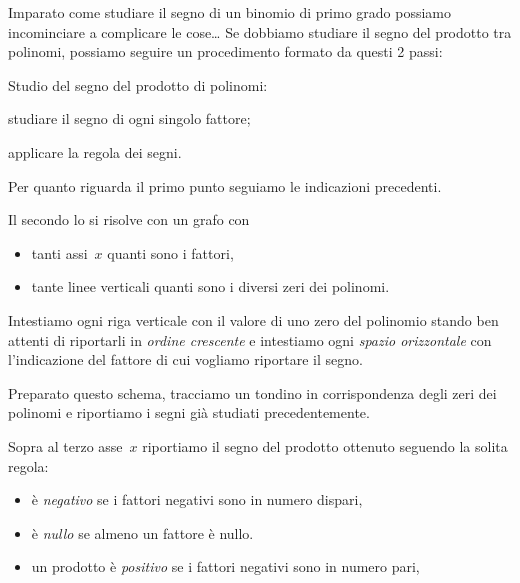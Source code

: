Imparato come studiare il segno di un binomio di primo grado possiamo 
incominciare a complicare le cose\dots
Se dobbiamo studiare il segno del prodotto tra polinomi, possiamo 
seguire un procedimento formato da questi 2 passi:

\begin{procedura}{}{}
 Studio del segno del prodotto di polinomi:
\begin{enumeratea}
\item studiare il segno di ogni singolo fattore;
\item applicare la regola dei segni.
\end{enumeratea}
\end{procedura}

Per quanto riguarda il primo punto seguiamo le indicazioni precedenti. 

Il secondo lo si risolve con un grafo con
\begin{itemize} [noitemsep]
\item tanti assi~\(x\) quanti sono i fattori, 
\item tante linee verticali quanti sono i diversi zeri dei polinomi. 
\end{itemize}

Intestiamo ogni riga verticale con il valore di uno zero del polinomio
stando ben attenti di riportarli in \emph{ordine crescente} e intestiamo ogni 
\emph{spazio orizzontale} con l'indicazione del fattore di cui vogliamo 
riportare il segno. 

Preparato questo schema, tracciamo un tondino in corrispondenza degli zeri 
dei polinomi e riportiamo i segni già studiati precedentemente. 

Sopra al terzo asse~\(x\) riportiamo il segno del prodotto ottenuto 
seguendo la solita regola: 
\begin{itemize} [noitemsep]
\item è \emph{negativo} se i fattori negativi sono in numero dispari, 
\item è \emph{nullo} se almeno un fattore è nullo.
\item un prodotto è \emph{positivo} se i fattori negativi sono in numero 
pari, 
\end{itemize}

